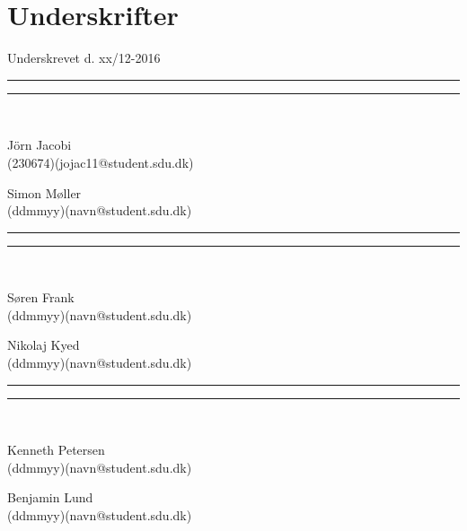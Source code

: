
\section*{Underskrifter}
\vspace{3ex} \hfill Underskrevet d. xx/12-2016\\

\newlength{\streg} \setlength{\streg}{0.49\linewidth}
\vspace*{\fill} \rule{\streg}{1pt} \hfill \rule{\streg}{1pt}\\
\begin{minipage}[b]{\streg}
 \centering
 \rule{0pt}{4ex}
 J\"{o}rn Jacobi \\
 {\footnotesize (230674)(jojac11@student.sdu.dk)}
\end{minipage}
\hfill
\begin{minipage}[b]{\streg}
 \centering
 Simon Møller \\
 {\footnotesize (ddmmyy)(navn@student.sdu.dk)}
\end{minipage}

\vspace*{\fill} \rule{\streg}{1pt} \hfill \rule{\streg}{1pt}\\
\begin{minipage}[b]{\streg}
 \centering
 \rule{0pt}{4ex}
 Søren Frank \\
 {\footnotesize (ddmmyy)(navn@student.sdu.dk)}
\end{minipage}
\hfill
\begin{minipage}[b]{\streg}
 \centering
 Nikolaj Kyed \\
 {\footnotesize (ddmmyy)(navn@student.sdu.dk)}
\end{minipage}

\vspace*{\fill} \rule{\streg}{1pt} \hfill \rule{\streg}{1pt}\\
\begin{minipage}[b]{\streg}
	\centering
	\rule{0pt}{4ex}
	Kenneth Petersen \\
	{\footnotesize (ddmmyy)(navn@student.sdu.dk)}
\end{minipage}
\hfill
\begin{minipage}[b]{\streg}
	\centering
	Benjamin Lund \\
	{\footnotesize (ddmmyy)(navn@student.sdu.dk)}
\end{minipage}